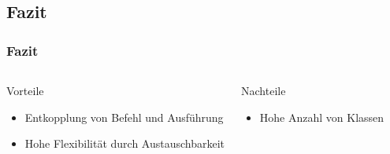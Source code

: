 \subsection{Fazit}
\begin{frame}
	\frametitle{Fazit}
	\begin{columns} 
    		\begin{exampleblock}{Vorteile}
    			\begin{itemize}
    				\item Entkopplung von Befehl und Ausführung
    				\item Hohe Flexibilität durch Austauschbarkeit
    			\end{itemize}
    		\end{exampleblock}
    		\begin{alertblock}{Nachteile}
    			\begin{itemize}
    				\item Hohe Anzahl von Klassen
    			\end{itemize}
    		\end{alertblock}
  	\end{columns}   	  		
\end{frame}
